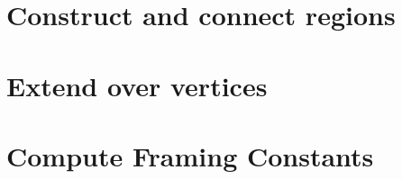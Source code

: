 \label{cha:alg2}


\section{Construct and connect regions}


\section{Extend over vertices}


\section{Compute Framing Constants}

